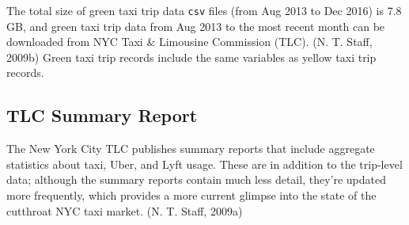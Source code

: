 \documentclass[12pt,twoside]{reedthesis}
\theoremstyle{definition}
\theoremstyle{definition}
\theoremstyle{definition}
\theoremstyle{remark}
\begin{document}
The total size of green taxi trip data \texttt{csv} files (from Aug 2013
to Dec 2016) is 7.8 GB, and green taxi trip data from Aug 2013 to the
most recent month can be downloaded from NYC Taxi \& Limousine
Commission (TLC). (N. T. Staff, 2009b) Green taxi trip records include
the same variables as yellow taxi trip records.

\subsection{TLC Summary Report}\label{tlc-summary-report}

The New York City TLC publishes summary reports that include aggregate
statistics about taxi, Uber, and Lyft usage. These are in addition to
the trip-level data; although the summary reports contain much less
detail, they're updated more frequently, which provides a more current
glimpse into the state of the cutthroat NYC taxi market. (N. T. Staff,
2009a)
\end{document}
